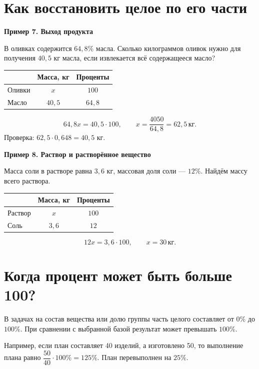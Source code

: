 \documentclass[a4paper,12pt]{article}
\newcommand{\ex}[1]{\par\smallskip\textcolor{darkaccent}{\textbf{#1}}\par}
\newcommand{\kg}{\,\text{кг}}
\begin{document}
\section{Как восстановить целое по его части}
\ex{Пример 7. Выход продукта}
В оливках содержится $64{,}8\%$ масла. Сколько килограммов оливок нужно для получения $40{,}5$ кг масла, если извлекается всё содержащееся масло?
\begin{center}
\begin{tabular}{@{}lcc@{}}
\toprule & Масса, кг & Проценты\\\midrule
Оливки & $x$ & $100$\\
Масло & $40{,}5$ & $64{,}8$\\\bottomrule
\end{tabular}
\end{center}
\[64{,}8x=40{,}5\cdot100,\qquad x=\frac{4050}{64{,}8}=62{,}5\kg.\]
Проверка: $62{,}5\cdot0{,}648=40{,}5$ кг.
\ex{Пример 8. Раствор и растворённое вещество}
Масса соли в растворе равна $3{,}6$ кг, массовая доля соли — $12\%$. Найдём массу всего раствора.
\begin{center}
\begin{tabular}{@{}lcc@{}}
\toprule & Масса, кг & Проценты\\\midrule
Раствор & $x$ & $100$\\
Соль & $3{,}6$ & $12$\\\bottomrule
\end{tabular}
\end{center}
\[12x=3{,}6\cdot100,\qquad x=30\kg.\]
\section{Когда процент может быть больше 100?}
В задачах на состав вещества или долю группы часть целого составляет от $0\%$ до $100\%$. При сравнении с выбранной базой результат может превышать $100\%$.

Например, если план составляет 40 изделий, а изготовлено 50, то выполнение плана равно $\dfrac{50}{40}\cdot100\%=125\%$. План перевыполнен на $25\%$.
\clearpage
\end{document}
